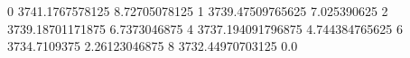 0 3741.1767578125 8.72705078125
1 3739.47509765625 7.025390625
2 3739.18701171875 6.7373046875
4 3737.194091796875 4.744384765625
6 3734.7109375 2.26123046875
8 3732.44970703125 0.0
